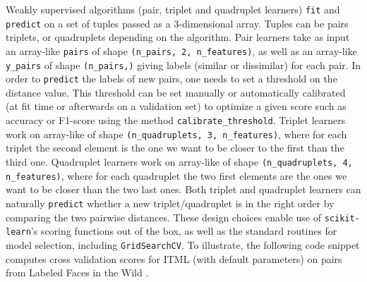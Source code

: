 \documentclass[twoside,11pt]{article}
\newcommand{\william}[1]{\todo[inline,caption={},color=blue!40]{{\it William:~}#1}}
\begin{document}
Weakly supervised algorithms (pair, triplet and quadruplet learners) \texttt{fit} and \texttt{predict} on a set of tuples passed as a 3-dimensional array. Tuples can be pairs triplets, or quadruplets depending on the algorithm.
Pair learners take as input an array-like \texttt{pairs} of shape \texttt{(n\_pairs, 2, n\_features)}, as well as an array-like \texttt{y\_pairs} of shape \texttt{(n\_pairs,)} giving labels (similar or dissimilar) for each pair.
In order to \texttt{predict} the labels of new pairs, one needs to set a threshold on the distance value.
This threshold can be set manually or automatically calibrated (at fit time or afterwards on a validation set) to optimize a given score such as accuracy or F1-score using the method \texttt{calibrate\_threshold}.
Triplet learners work on array-like of shape \texttt{(n\_quadruplets, 3, n\_features)}, where for each triplet the second element is the one we want to be closer to the first than the third one.
Quadruplet learners work on array-like of shape \texttt{(n\_quadruplets, 4, n\_features)}, where for each quadruplet the two first elements are the ones we want to be closer than the two last ones. Both triplet and quadruplet learners can naturally \texttt{predict} whether a new triplet/quadruplet is in the right order by comparing the two pairwise distances.
These design choices enable use of \texttt{scikit-learn}'s scoring functions out of the box, as well as the standard routines for model selection, including \texttt{GridSearchCV}.
To illustrate, the following code snippet computes cross validation scores for ITML (with default parameters) on pairs from Labeled Faces in the Wild \citep{Huang12}.
\end{document}
